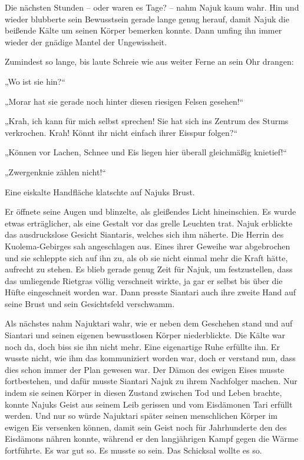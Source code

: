 \documentclass[10pt, a4paper, oneside]{book}
\begin{document}
Die nächsten Stunden – oder waren es Tage? – nahm Najuk kaum wahr. Hin und wieder blubberte sein Bewusstsein gerade lange genug herauf, damit Najuk die beißende Kälte um seinen Körper bemerken konnte. Dann umfing ihn immer wieder der gnädige Mantel der Ungewissheit.

Zumindest so lange, bis laute Schreie wie aus weiter Ferne an sein Ohr drangen:

„Wo ist sie hin?“

„Morar hat sie gerade noch hinter diesen riesigen Felsen gesehen!“

„Krah, ich kann für mich selbst sprechen! Sie hat sich ins Zentrum des Sturms verkrochen. Krah! Könnt ihr nicht einfach ihrer Eisspur folgen?“

„Können vor Lachen, Schnee und Eis liegen hier überall gleichmäßig knietief!“

„Zwergenknie zählen nicht!“

Eine eiskalte Handfläche klatschte auf Najuks Brust.

Er öffnete seine Augen und blinzelte, als gleißendes Licht hineinschien. Es wurde etwas erträglicher, als eine Gestalt vor das grelle Leuchten trat. Najuk erblickte das ausdruckslose Gesicht Siantaris, welches sich ihm näherte. Die Herrin des Kuolema-Gebirges sah angeschlagen aus. Eines ihrer Geweihe war abgebrochen und sie schleppte sich auf ihn zu, als ob sie nicht einmal mehr die Kraft hätte, aufrecht zu stehen. Es blieb gerade genug Zeit für Najuk, um festzustellen, dass das umliegende Rietgras völlig verschneit wirkte, ja gar er selbst bis über die Hüfte eingeschneit worden war. Dann presste Siantari auch ihre zweite Hand auf seine Brust und sein Gesichtsfeld verschwamm.

Als nächstes nahm Najuktari wahr, wie er neben dem Geschehen stand und auf Siantari und seinen eigenen bewusstlosen Körper niederblickte. Die Kälte war noch da, doch biss sie ihn nicht mehr. Eine eigenartige Ruhe erfüllte ihn. Er wusste nicht, wie ihm das kommuniziert worden war, doch er verstand nun, dass dies schon immer der Plan gewesen war. Der Dämon des ewigen Eises musste fortbestehen, und dafür musste Siantari Najuk zu ihrem Nachfolger machen. Nur indem sie seinen Körper in diesen Zustand zwischen Tod und Leben brachte, konnte Najuks Geist aus seinem Leib gerissen und vom Eisdämonen Tari erfüllt werden. Und nur so würde Najuktari später seinen menschlichen Körper im ewigen Eis versenken können, damit sein Geist noch für Jahrhunderte den des Eisdämons nähren konnte, während er den langjährigen Kampf gegen die Wärme fortführte. Es war gut so. Es musste so sein. Das Schicksal wollte es so.
\end{document}
